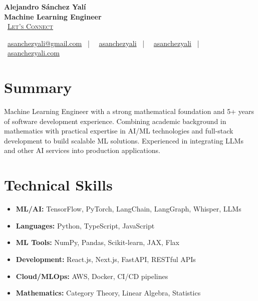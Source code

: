\documentclass[letterpaper,11pt]{article}
\begin{document}
\begin{center}
\textbf{\Huge Alejandro Sánchez Yalí}\\[0.3em]
\textbf{\Large Machine Learning Engineer}\\[0.5em]
\small
\faCalendar\ \href{https://cal.com/asanchezyali/full-time-opportunities}{\textsc{Let's Connect}}

\vspace{1em}
\faEnvelope\ \href{mailto:asanchezyali@gmail.com}{asanchezyali@gmail.com}  ~|~
\faLinkedin\ \href{https://www.linkedin.com/in/asanchezyali}{asanchezyali} ~|~
\faGithub\ \href{https://github.com/asanchezyali}{asanchezyali}  ~|~
\faGlobe\ \href{https://asanchezyali.com}{asanchezyali.com}
\end{center}

\section{Summary}
Machine Learning Engineer with a strong mathematical foundation and 5+ years of software development experience. Combining academic background in mathematics with practical expertise in AI/ML technologies and full-stack development to build scalable ML solutions. Experienced in integrating LLMs and other AI services into production applications.

\section{Technical Skills}
\begin{itemize}[leftmargin=*]
  \item \textbf{ML/AI:} TensorFlow, PyTorch, LangChain, LangGraph, Whisper, LLMs
  \item \textbf{Languages:} Python, TypeScript, JavaScript
  \item \textbf{ML Tools:} NumPy, Pandas, Scikit-learn, JAX, Flax
  \item \textbf{Development:} React.js, Next.js, FastAPI, RESTful APIs
  \item \textbf{Cloud/MLOps:} AWS, Docker, CI/CD pipelines
  \item \textbf{Mathematics:} Category Theory, Linear Algebra, Statistics
\end{itemize}
\end{document}
